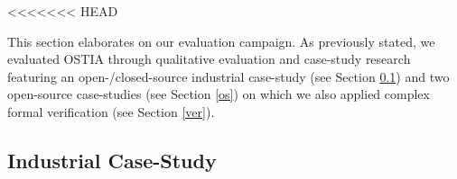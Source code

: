 <<<<<<< HEAD



This section elaborates on our evaluation campaign. As previously stated, we evaluated OSTIA through qualitative evaluation and case-study research featuring an open-/closed-source industrial case-study (see Section \ref{cs}) and two open-source case-studies (see Section \ref{os}) on which we also applied complex formal verification (see Section \ref{ver}).

\subsection{Industrial Case-Study}\label{cs}

